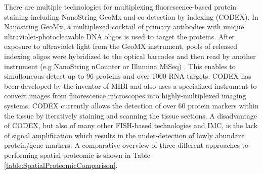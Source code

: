 There are multiple technologies for multiplexing fluorescence-based protein staining including NanoString GeoMx and co-detection by indexing (CODEX). In Nanostring GeoMx, a multiplexed cocktail of primary antibodies with  unique ultraviolet-photocleavable DNA oligos is used to target the proteins. After exposure to ultraviolet light from the GeoMX instrument, pools of released indexing oligos were hybridized to the optical barcodes and then read by another instrument (e.g NanoString nCounter or Illumina MiSeq) \cite{de2020unraveling, helmink2020b}. This enables to simultaneous detect up to 96 proteins and over 1000 RNA targets. CODEX has been developed by the inventor of MIBI and also uses a specialized instrument to convert images from fluorescence microscopes into highly-multiplexed imaging systems. CODEX currently allows the detection of over 60 protein markers within the tissue by iteratively staining and scanning the tissue sections\cite{goltsev2018deep}. A disadvantage of CODEX, but also of many other FISH-based technologies and IMC, is the lack of signal amplification which results in the under-detection of lowly abundant protein/gene markers. A comparative overview of three different approaches to performing spatial proteomic is shown in Table \ref{table:SpatialProteomicComparison}. 

